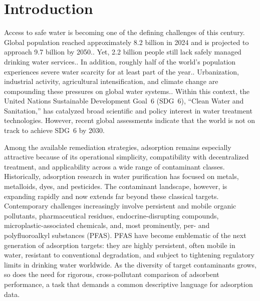 \documentclass[journal=jacsat,manuscript=article]{achemso}
\begin{document}
	\section{Introduction}
	Access to safe water is becoming one of the defining challenges of this century. Global population reached approximately 8.2 billion in 2024 and is projected to approach 9.7 billion by 2050.\cite{noauthor_progress_nodate}. Yet, 2.2 billion people still lack safely managed drinking water services.\cite{noauthor_united_nodate01}. In addition, roughly half of the world's population experiences severe water scarcity for at least part of the year.\cite{mekonnen_four_2016}. Urbanization, industrial activity, agricultural intensification, and climate change are compounding these pressures on global water systems.\cite{vorosmarty_global_2010}. Within this context, the United Nations Sustainable Development Goal~6 (SDG~6), ``Clean Water and Sanitation,'' has catalyzed broad scientific and policy interest in water treatment technologies. However, recent global assessments indicate that the world is not on track to achieve SDG~6 by 2030.\cite{noauthor_blueprint_nodate}
	
	Among the available remediation strategies, adsorption remains especially attractive because of its operational simplicity, compatibility with decentralized treatment, and applicability across a wide range of contaminant classes. Historically, adsorption research in water purification has focused on metals, metalloids, dyes, and pesticides\cite{crini_non-conventional_2006, fu_removal_2011, ahmaruzzaman_industrial_2011}. The contaminant landscape, however, is expanding rapidly and now extends far beyond these classical targets. Contemporary challenges increasingly involve persistent and mobile organic pollutants, pharmaceutical residues, endocrine-disrupting compounds, microplastic-associated chemicals, and, most prominently, per- and polyfluoroalkyl substances (PFAS)\cite{aus_der_beek_pharmaceuticals_2016,thacharodi_water_2023, li_microplastics_2018, rahman_behaviour_2014}. PFAS have become emblematic of the next generation of adsorption targets: they are highly persistent, often mobile in water, resistant to conventional degradation, and subject to tightening regulatory limits in drinking water worldwide\cite{buck_perfluoroalkyl_2011, gluge_overview_2020, us_epa_pfas_2021}. As the diversity of target contaminants grows, so does the need for rigorous, cross-pollutant comparison of adsorbent performance, a task that demands a common descriptive language for adsorption data\cite{foo_insights_2010, hu_critical_2023}.
\end{document}
